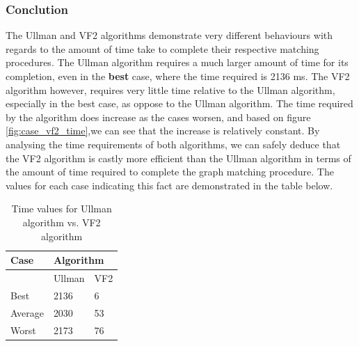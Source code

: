 \subsubsection{Conclution}
The Ullman and VF2 algorithms demonstrate very different behaviours with regards to the amount of time take to complete their respective matching procedures.\newline\newline
The Ullman algorithm requires a much larger amount of time for its completion, even in the \textbf{best} case, where the time required is 2136 ms.\newline\newline
The VF2 algorithm however, requires very little time relative to the Ullman algorithm, especially in the best case, as oppose to the Ullman algorithm. The 
time required by the algorithm does increase as the cases worsen, and based on figure \ref{fig:case_vf2_time},we can see that the increase is relatively constant.\newline\newline
By analysing the time requirements of both algorithms, we can safely deduce that the VF2 algorithm is castly more efficient than the Ullman algorithm in terms 
of the amount of time required to complete the graph matching procedure. The values for each case indicating this fact are demonstrated in the table below.

\begin{table}[h]
\centering
\caption{Time values for Ullman algorithm vs. VF2 algorithm}
\label{my-label}
\begin{tabular}{|l|l|l|}
\hline
Case    & \multicolumn{2}{l|}{Algorithm} \\ \hline
        & Ullman          & VF2          \\ \hline
Best    & 2136            & 6            \\ \hline
Average & 2030            & 53           \\ \hline
Worst   & 2173            & 76           \\ \hline
\end{tabular}
\end{table}